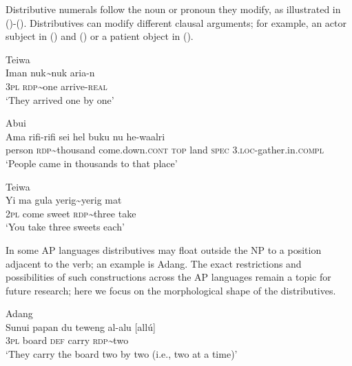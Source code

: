 Distributive numerals follow the noun or pronoun they modify, as illustrated in ()-(). Distributives can modify different clausal arguments; for example, an actor subject in () and () or a patient object in ().


\ea%
\label{bkm:Ref342655549}
Teiwa\\
\gll Iman  nuk\textit{\~{}}nuk  aria-n\\
    \textsc{3pl}   \textsc{rdp}\textit{\~{}}one   arrive-\textsc{real}\\
\glt `They arrived one by one'
\z






\ea%
\label{bkm:Ref342738939}
Abui\\
\gll  Ama    rifi-rifi    sei        hel  buku  nu  he-waalri \\
    person    \textsc{rdp\~{}}thousand   come.down.\textsc{cont}    \textsc{top  } land  \textsc{spec}   3.\textsc{loc-}gather.in.\textsc{compl}  \\
\glt `People came in thousands to that place'
\z








\ea%
\label{bkm:Ref342655553}
Teiwa\\
\gll Yi   ma   gula   yerig\~{}yerig   mat\\
     2\textsc{pl } come  sweet  \textsc{rdp}\textit{\~{}}three  take \\
\glt `You take three sweets each'
\z







In some AP languages distributives may float outside the NP to a position adjacent to the verb; an example is Adang. The exact restrictions and possibilities of such constructions across the AP languages remain a topic for future research; here we focus on the morphological shape of the distributives.


\ea
Adang \\
 \gll  Sunui{\textltailn}   papan   du   teweng al-alu  [all\'u]\\
   3\textsc{pl}    board  \textsc{def}   carry   \textsc{rdp}\textit{\~{}}two \\
 \glt `They carry the board two by two (i.e., two at a time)'
\z







